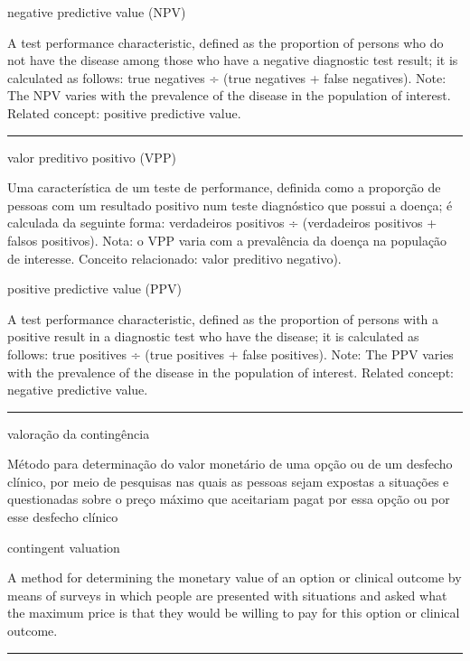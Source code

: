 \documentclass[
]{book}
\begin{document}
negative predictive value (NPV)

A test performance characteristic, defined as the proportion of persons who do not have the disease among those who have a negative diagnostic test result; it is calculated as follows: true negatives ÷ (true negatives + false negatives). Note: The NPV varies with the prevalence of the disease in the population of interest. Related concept: positive predictive value.

\begin{center}\rule{0.5\linewidth}{0.5pt}\end{center}

valor preditivo positivo (VPP)

Uma característica de um teste de performance, definida como a proporção de pessoas com um resultado positivo num teste diagnóstico que possui a doença; é calculada da seguinte forma: verdadeiros positivos ÷ (verdadeiros positivos + falsos positivos). Nota: o VPP varia com a prevalência da doença na população de interesse. Conceito relacionado: valor preditivo negativo).

positive predictive value (PPV)

A test performance characteristic, defined as the proportion of persons with a positive result in a diagnostic test who have the disease; it is calculated as follows: true positives ÷ (true positives + false positives). Note: The PPV varies with the prevalence of the disease in the population of interest. Related concept: negative predictive value.

\begin{center}\rule{0.5\linewidth}{0.5pt}\end{center}

valoração da contingência

Método para determinação do valor monetário de uma opção ou de um desfecho clínico, por meio de pesquisas nas quais as pessoas sejam expostas a situações e questionadas sobre o preço máximo que aceitariam pagat por essa opção ou por esse desfecho clínico

contingent valuation

A method for determining the monetary value of an option or clinical outcome by means of surveys in which people are presented with situations and asked what the maximum price is that they would be willing to pay for this option or clinical outcome.

\begin{center}\rule{0.5\linewidth}{0.5pt}\end{center}
\end{document}

